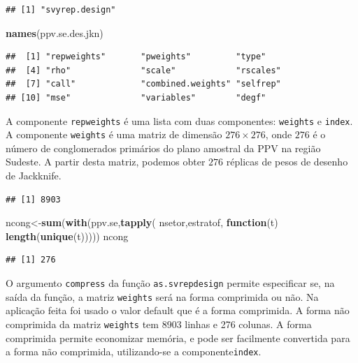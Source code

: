 \documentclass[]{book}
\newenvironment{Shaded}{\begin{snugshade}}{\end{snugshade}}
\newcommand{\KeywordTok}[1]{\textcolor[rgb]{0.13,0.29,0.53}{\textbf{#1}}}
\newcommand{\ControlFlowTok}[1]{\textcolor[rgb]{0.13,0.29,0.53}{\textbf{#1}}}
\newcommand{\OperatorTok}[1]{\textcolor[rgb]{0.81,0.36,0.00}{\textbf{#1}}}
\newcommand{\NormalTok}[1]{#1}
\theoremstyle{definition}
\theoremstyle{definition}
\theoremstyle{definition}
\theoremstyle{remark}
\begin{document}
\begin{verbatim}
## [1] "svyrep.design"
\end{verbatim}

\begin{Shaded}
\begin{Highlighting}[]
\KeywordTok{names}\NormalTok{(ppv.se.des.jkn)}
\end{Highlighting}
\end{Shaded}

\begin{verbatim}
##  [1] "repweights"       "pweights"         "type"            
##  [4] "rho"              "scale"            "rscales"         
##  [7] "call"             "combined.weights" "selfrep"         
## [10] "mse"              "variables"        "degf"
\end{verbatim}

A componente \texttt{repweights} é uma lista com duas componentes:
\texttt{weights} e \texttt{index}. A componente \texttt{weights} é uma
matriz de dimensão \(276 \times 276\), onde \(276\) é o número de
conglomerados primários do plano amostral da PPV na região Sudeste. A
partir desta matriz, podemos obter \(276\) réplicas de pesos de desenho
de Jackknife.

\begin{Shaded}
\end{Shaded}

\begin{verbatim}
## [1] 8903
\end{verbatim}

\begin{Shaded}
\begin{Highlighting}[]
\NormalTok{ncong<-}\KeywordTok{sum}\NormalTok{(}\KeywordTok{with}\NormalTok{(ppv.se,}\KeywordTok{tapply}\NormalTok{( nsetor,estratof, }\ControlFlowTok{function}\NormalTok{(t) }\KeywordTok{length}\NormalTok{(}\KeywordTok{unique}\NormalTok{(t)))))}
\NormalTok{ncong}
\end{Highlighting}
\end{Shaded}

\begin{verbatim}
## [1] 276
\end{verbatim}

O argumento \texttt{compress} da função \texttt{as.svrepdesign} permite
especificar se, na saída da função, a matriz \texttt{weights} será na
forma comprimida ou não. Na aplicação feita foi usado o valor default
que é a forma comprimida. A forma não comprimida da matriz
\texttt{weights} tem 8903 linhas e 276 colunas. A forma comprimida
permite economizar memória, e pode ser facilmente convertida para a
forma não comprimida, utilizando-se a componente\texttt{index}.
\end{document}
